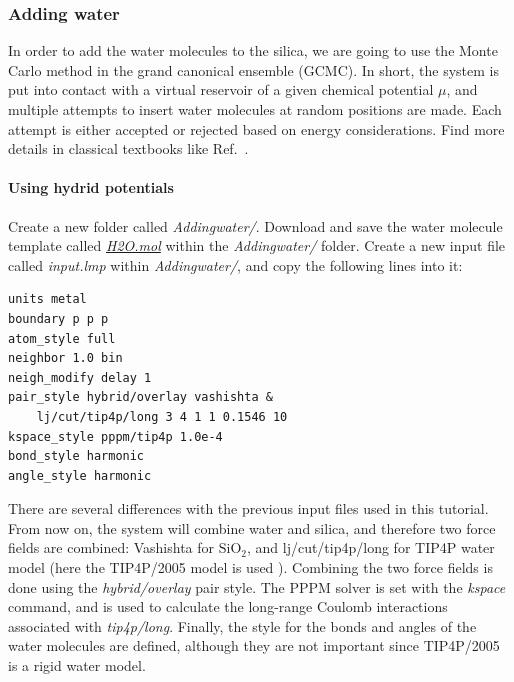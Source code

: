 \documentclass[9pt,tutorial]{livecoms}
\begin{document}
\subsubsection{Adding water}
\noindent In order to add the water molecules to the silica, we are going to use
the Monte Carlo method in the grand canonical ensemble (GCMC). In short, the
system is put into contact with a virtual reservoir of a given chemical potential
$\mu$, and multiple attempts to insert water molecules at random positions are
made. Each attempt is either accepted or rejected based on energy considerations.
Find more details in classical textbooks like Ref.~.

\paragraph{Using hydrid potentials}
\noindent Create a new folder called \textit{Addingwater/}. Download and save
the water molecule template called
\href{https://raw.githubusercontent.com/lammpstutorials/lammpstutorials-article/main/files/tutorial6/H2O.mol}{\textit{H2O.mol}}
within the \textit{Addingwater/} folder. Create a new input file called \textit{input.lmp}
within \textit{Addingwater/}, and copy the following lines into it:
{\normalsize \begin{verbatim}
units metal
boundary p p p
atom_style full
neighbor 1.0 bin
neigh_modify delay 1
pair_style hybrid/overlay vashishta &
    lj/cut/tip4p/long 3 4 1 1 0.1546 10
kspace_style pppm/tip4p 1.0e-4
bond_style harmonic
angle_style harmonic
\end{verbatim}}
There are several differences with the previous input files used in this tutorial.
From now on, the system will combine water and silica, and therefore two force
fields are combined: Vashishta for $\text{SiO}_2$, and lj/cut/tip4p/long for
TIP4P water model (here the TIP4P/2005 model is used \cite{abascal2005general}).
Combining the two force fields is done using the \textit{hybrid/overlay} pair
style. The PPPM solver \cite{luty1996calculating} is set with the \textit{kspace}
command, and is used to calculate the long-range Coulomb interactions associated
with \textit{tip4p/long}. Finally, the style for the bonds
and angles of the water molecules are defined, although they are not important
since TIP4P/2005 is a rigid water model.
\end{document}
